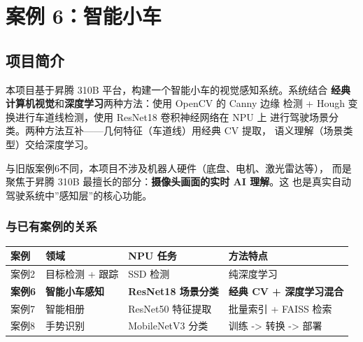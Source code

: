 \chapter{案例 6：智能小车}\label{ux6848ux4f8b-6ux667aux80fdux5c0fux8f66}

\section{项目简介}\label{src-experiment-case6-h1}

本项目基于昇腾 310B 平台，构建一个智能小车的视觉感知系统。系统结合
\textbf{经典计算机视觉}和\textbf{深度学习}两种方法：使用 OpenCV 的 Canny
边缘 检测 + Hough 变换进行车道线检测，使用 ResNet18 卷积神经网络在 NPU
上 进行驾驶场景分类。两种方法互补------几何特征（车道线）用经典 CV
提取， 语义理解（场景类型）交给深度学习。

与旧版案例6不同，本项目不涉及机器人硬件（底盘、电机、激光雷达等），
而是聚焦于昇腾 310B 最擅长的部分：\textbf{摄像头画面的实时 AI 理解}。这
也是真实自动驾驶系统中''感知层''的核心功能。

\subsection{与已有案例的关系}\label{src-experiment-case6-h2}

\begin{longtable}[]{@{}
  >{\raggedright\arraybackslash}p{}
  >{\raggedright\arraybackslash}p{}
  >{\raggedright\arraybackslash}p{}
  >{\raggedright\arraybackslash}p{}@{}}
\toprule\noalign{}
\begin{minipage}[b]{\linewidth}\raggedright
案例
\end{minipage} & \begin{minipage}[b]{\linewidth}\raggedright
领域
\end{minipage} & \begin{minipage}[b]{\linewidth}\raggedright
NPU 任务
\end{minipage} & \begin{minipage}[b]{\linewidth}\raggedright
方法特点
\end{minipage} \\
\midrule\noalign{}
\endhead
\bottomrule\noalign{}
\endlastfoot
案例2 & 目标检测 + 跟踪 & SSD 检测 & 纯深度学习 \\
\textbf{案例6} & \textbf{智能小车感知} & \textbf{ResNet18 场景分类} &
\textbf{经典 CV + 深度学习混合} \\
案例7 & 智能相册 & ResNet50 特征提取 & 批量索引 + FAISS 检索 \\
案例8 & 手势识别 & MobileNetV3 分类 & 训练 -\textgreater{} 转换
-\textgreater{} 部署 \\
\end{longtable}

